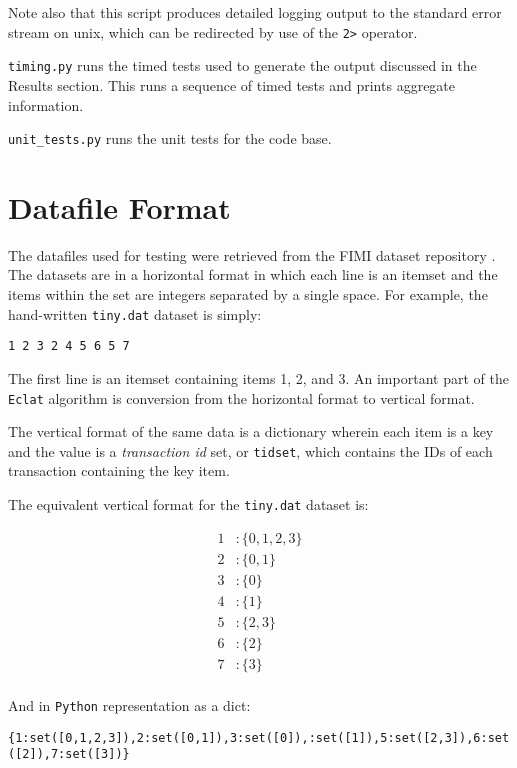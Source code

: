 \documentclass[11pt]{article}
\begin{document}
\begin{multicols}{2}
Note also that this script produces detailed logging output to the
standard error stream on unix, which can be redirected by use of the
\texttt{2>} operator.

\texttt{timing.py} runs the timed tests used to generate the output
discussed in the Results section.  This runs a sequence
of timed tests and prints aggregate information.

\texttt{unit\_tests.py} runs the unit tests for the code base.

\section{Datafile Format}

The datafiles used for testing were retrieved from the FIMI dataset
repository \cite{fimiDatasetRepo}.  The datasets are in a horizontal
format in which each line is an itemset and the items within the set
are integers separated by a single space.  For example, the
hand-written \texttt{tiny.dat} dataset is simply:

\texttt{1 2 3 2 4 5 6 5 7}

The first line is an itemset containing items 1, 2, and 3.  An
important part of the \texttt{Eclat} algorithm is conversion from the
horizontal format to vertical format.

The vertical format of the same data is a dictionary wherein each item
is a key and the value is a \emph{transaction id} set, or
\texttt{tidset}, which contains the IDs of each transaction containing
the key item.

The equivalent vertical format for the \texttt{tiny.dat} dataset is:

\begin{align*}
  1 &: \{ 0, 1, 2, 3 \} \\
  2 &: \{ 0, 1 \} \\
  3 &: \{ 0 \} \\
  4 &: \{ 1 \} \\
  5 &: \{ 2, 3 \} \\
  6 &: \{ 2 \} \\
  7 &: \{ 3 \} \\
\end{align*}

And in \texttt{Python} representation as a dict:

\texttt{\{1:set([0,1,2,3]),2:set([0,1]),3:set([0]),:set([1]),5:set([2,3]),6:set([2]),7:set([3])\}}




\end{multicols} %
\end{document}
